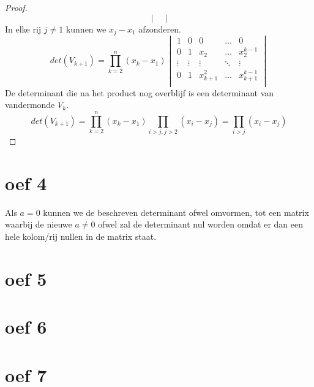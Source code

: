 \documentclass[lineaire_algebra_oplossingen.tex]{subfiles}
\begin{document}
\begin{proof}
\[\begin{vmatrix}
\end{vmatrix}
\]
In elke rij $j \neq 1$ kunnen we $x_j-x_1$ afzonderen.
\[
det(V_{k+1}) =
\prod_{k=2}^n(x_k-x_1)
\begin{vmatrix}
1 & 0 & 0 & \hdots & 0\\
0 & 1 & x_2 & \hdots & x_2^{k-1}\\
\vdots &\vdots &\vdots & \ddots & \vdots \\
0 & 1 & x_{k+1}^2  & \hdots & x_{k+1}^{k-1}\\
\end{vmatrix}
\]
De determinant die na het product nog overblijf is een determinant van vandermonde $V_k$.
\[
det(V_{k+1}) =
\prod_{k=2}^n(x_k-x_1)
\prod_{i>j,j>2}(x_i-x_j)
= \prod_{i>j}(x_i-x_j)
\]
\end{proof}
\section{oef 4}
Als $a=0$ kunnen we de beschreven determinant ofwel omvormen, tot een matrix waarbij de nieuwe $a \neq 0$ ofwel zal de determinant nul worden omdat er dan een hele kolom/rij nullen in de matrix staat. 

\section{oef 5}
\section{oef 6}
\section{oef 7}
\end{document}
